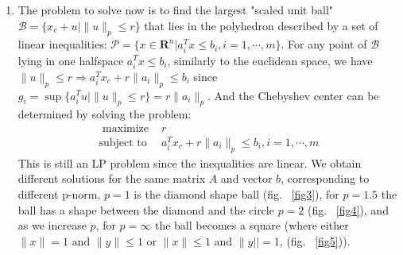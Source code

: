 \documentclass[10pt]{article}
\newcommand{\0}{\mat{0}}
\begin{document}
\begin{enumerate}
\begin{enumerate}
\item The problem to solve now is to find the largest "scaled unit ball" $\mathcal{B} = \{x_c + u | \| u \|_p \le r \}$ that lies in the polyhedron described by a set of linear inequalities:
$\mathcal{P} = \{x \in \mathbf{R}^n | a_i^T x \le b_i, i=1, \cdots, m \}$. For any point of $\mathcal{B}$ lying in one halfspace $a_i^T x \le b_i$, similarly to the euclidean space, 
we have $\| u \|_p \le r \Rightarrow a_i^T x_c +  r \| a_i \|_p  \le b_i$ since $g_i = \sup{\{a_i^T u | \| u \|_p \le r \}} = r \|a_i\|_p$. And the Chebyshev center can be determined by solving the problem:
\begin{align*}
	\text{ maximize } &  r\\
	\text{subject to }  & a_i^T x_c +  r \| a_i \|_p  \le b_i,  i=1, \cdots, m
\end{align*}
This is still an LP problem since the inequalities are linear.
We obtain different solutions for the same matrix $A$ and vector $b$, corresponding to different p-norm, $p=1$ is the diamond shape ball (fig.  ~\ref{fig3}),
for $p=1.5$  the ball has a shape between the diamond and the circle $p=2$ (fig. ~\ref{fig4}), and as we increase $p$, for $p=\infty$ the ball becomes a square 
(where either $\|x\| =1 \text{ and } \| y \| \le 1 \text{ or } \| x \| \le 1 \text{ and } \| y || = 1$,  (fig. ~\ref{fig5})).


\end{enumerate}
\end{enumerate}
\end{document}
